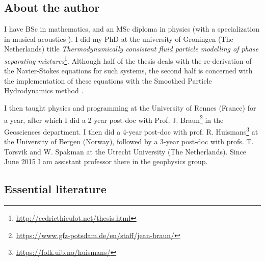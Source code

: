 \documentclass[a4paper]{article}
\begin{document}
\subsection{About the author} %

I have BSc in mathematics, and an MSc diploma in physics (with a specialization in 
musical acoustics \cite{dewl02}). I did my PhD at the 
university of Groningen (The Netherlands) title {\sl Thermodynamically consistent 
fluid particle modelling of phase separating 
mixtures}\footnote{\url{http://cedricthieulot.net/thesis.html}}.
Although half of the thesis deals with the re-derivation of the Navier-Stokes 
equations for such systems\cite{esth03}, the second half is concerned with 
the implementation of these equations with the Smoothed Particle Hydrodynamics
method \cite{thje05a,thje05b,thes05}.

I then taught physics and programming at the University of Rennes (France) for a year, 
after which I did a 2-year post-doc with Prof. J. 
Braun\footnote{\url{https://www.gfz-potsdam.de/en/staff/jean-braun/}} in the 
Geosciences department. 
I then did a 4-year post-doc with prof. R. 
Huismans\footnote{\url{https://folk.uib.no/huismans/}} at the University of Bergen (Norway), 
followed by a 3-year post-doc with profs. T. Torsvik and W. Spakman at the Utrecht
University (The Netherlands). 
Since June 2015 I am assistant professor there in the geophysics group.
 


\subsection{Essential literature} %
\end{document}
